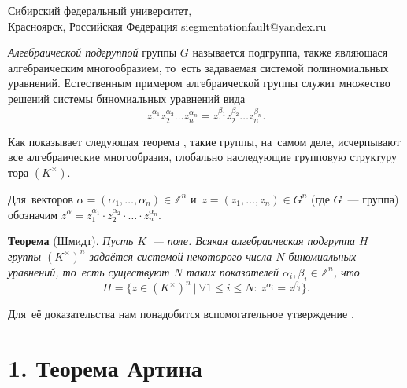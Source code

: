 \documentclass[twoside]{article}
\begin{document}
\maketitBegin %

\author{Николай А. Мишко}
{Сибирский федеральный университет,\\
Красноярск, Российская Федерация} {siegmentationfault@yandex.ru}


 \maketitEnd  %




\textit{Алгебраической подгруппой} группы $G$ называется подгруппа, также являющася
алгебраическим многообразием, то~есть задаваемая системой полиномиальных уравнений.
Естественным примером алгебраической группы служит множество решений системы биномиальных уравнений вида
$$
    z_1^{\alpha_1} z_2^{\alpha_2} \ldots z_n^{\alpha_n} = z_1^{\beta_1} z_2^{\beta_2} \ldots z_n^{\beta_n}.
$$

Как показывает следующая теорема \cite{Schm94}, такие группы, на~самом деле, исчерпывают все алгебраические многообразия,
глобально наследующие групповую структуру тора $(K^\times)$.

Для~векторов $\alpha = (\alpha_1, \ldots, \alpha_n) \in \mathbb{Z}^n$ и~$z = (z_1, \ldots, z_n) \in G^n$ (где $G$~— группа)
обозначим $z^\alpha = z_1^{\alpha_1} \cdot z_2^{\alpha_2} \cdot \ldots \cdot z_n^{\alpha_n}$.

\medskip\noindent\textbf{Теорема} (Шмидт). \emph{
    Пусть $K$~— поле. Всякая алгебраическая подгруппа $H$ группы $(K^{\times})^n$ задаётся
    системой некоторого числа $N$ биномиальных уравнений, то~есть существуют $N$ таких показателей $\alpha_i, \beta_i \in \mathbb{Z}^n$, что
    $$
        H = \{ z \in (K^{\times})^n\ |\ \forall 1 \leq i \leq N{:}\ z^{\alpha_i} = z^{\beta_i} \}.
    $$
}

Для~её доказательства нам понадобится вспомогательное утверждение \cite{Art48}.

\section*{1. Теорема Артина}
\end{document}
